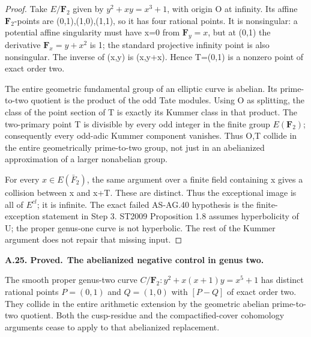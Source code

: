 \documentclass[11pt,a4paper]{article}
\newenvironment{claim}[3]{\par\medskip\noindent\hypertarget{#1}{\textbf{#1. #2.}}\ \textbf{#3.}\par\nopagebreak\smallskip\begingroup\itshape}{\endgroup\par\smallskip}
\begin{document}
\begin{proof}

Take \(E/\mathbf{F}_2\) given by \(y^2+xy=x^3+1\), with origin O at infinity. Its affine \(\mathbf{F}_2\)-points are (0,1),(1,0),(1,1), so it has four rational points. It is nonsingular: a potential affine singularity must have x=0 from \(\mathbf{F}_y=x\), but at (0,1) the derivative \(\mathbf{F}_x=y+x^2\) is 1; the standard projective infinity point is also nonsingular. The inverse of (x,y) is (x,y+x). Hence T=(0,1) is a nonzero point of exact order two.

The entire geometric fundamental group of an elliptic curve is abelian. Its prime-to-two quotient is the product of the odd Tate modules. Using O as splitting, the class of the point section of T is exactly its Kummer class in that product. The two-primary point T is divisible by every odd integer in the finite group \(E(\mathbf{F}_2)\); consequently every odd-adic Kummer component vanishes. Thus O,T collide in the entire geometrically prime-to-two group, not just in an abelianized approximation of a larger nonabelian group.

For every \(x\in E(\bar F_2)\), the same argument over a finite field containing x gives a collision between x and x+T. These are distinct. Thus the exceptional image is all of \(E^{cl}\); it is infinite. The exact failed AS-AG.40 hypothesis is the finite-exception statement in Step 3. ST2009 Proposition 1.8 assumes hyperbolicity of U; the proper genus-one curve is not hyperbolic. The rest of the Kummer argument does not repair that missing input.


\end{proof}

\begin{claim}{A.25}{Proved}{The abelianized negative control in genus two}

The smooth proper genus-two curve
$C/\mathbf F_2:y^2+x(x+1)y=x^5+1$ has distinct rational points
$P=(0,1)$ and $Q=(1,0)$ with $[P-Q]$ of exact order two. They
collide in the entire arithmetic extension by the geometric
abelian prime-to-two quotient. Both the cusp-residue and the
compactified-cover cohomology arguments cease to apply to that
abelianized replacement.

\end{claim}
\end{document}
